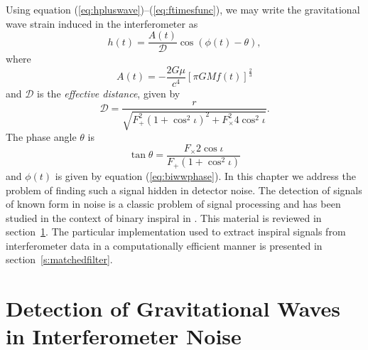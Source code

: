 
Using equation (\ref{eq:hpluswave})--(\ref{eq:ftimesfunc}), we may write the
gravitational wave strain induced in the interferometer as
\begin{equation}
h(t) = \frac{A(t)}{\mathcal{D}} \cos\left( \phi(t) - \theta \right),
\label{eq:rootwaveform}
\end{equation}
where
\begin{equation}
A(t) = - \frac{2G\mu}{c^4} \left[ \pi GM f(t) \right]^\frac{2}{3}
\end{equation}
and $\mathcal{D}$ is the \emph{effective distance}, given by
\begin{equation}
\mathcal{D} = \frac{r}{\sqrt{F_+^2 (1 + \cos^2 \iota)^2 + F_\times^2 4 \cos^2 \iota}}.
\end{equation}
The phase angle $\theta$ is
\begin{equation}
\tan \theta = \frac{F_\times 2\cos \iota}{F_+(1 + \cos^2 \iota)}
\end{equation}
and $\phi(t)$ is given by equation (\ref{eq:biwwphase}).
In this chapter we address the problem of finding such a signal hidden in
detector noise. The detection of signals of known form in noise is a classic
problem of signal processing\cite{wainstein:1962} and has been studied in the
context of binary inspiral in \cite{Finn:1992wt,Finn:1992xs}. This material is
reviewed in section~\ref{s:detectiontheory}. The particular implementation
used to extract inspiral signals from interferometer data in a computationally
efficient manner is presented in section~\ref{s:matchedfilter}.

\section{Detection of Gravitational Waves in Interferometer Noise}
\label{s:detectiontheory}


